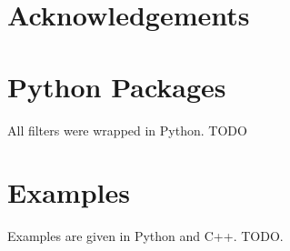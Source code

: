 \documentclass{InsightArticle}
\begin{document}
\section*{Acknowledgements}






\appendix

\section{Python Packages}
\label{sec:python_packages}
All filters were wrapped in Python.
TODO

\section{Examples}
\label{sec:examples}
Examples are given in Python and C++.
TODO.








\end{document}
